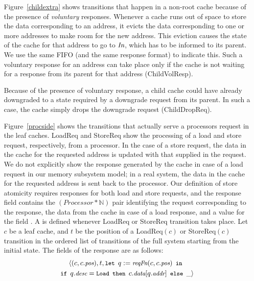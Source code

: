 Figure~\ref{childextra} shows transitions that happen in a non-root cache
because of the presence of \emph{voluntary} responses. Whenever a cache runs
out of space to store the data corresponding to an address, it evicts the data
corresponding to one or more addresses to make room for the new address. This
eviction causes the state of the cache for that address to go to $\textit{In}$, which
has to be informed to its parent. We use the same \cpResp{} FIFO (and the same
response format) to indicate this. Such a voluntary response for an address can
take place only if the cache is not waiting for a response from its parent for
that address (ChildVolResp).

Because of the presence of voluntary response, a child cache could have already
downgraded to a state required by a downgrade request from its parent. In such
a case, the cache simply drops the downgrade request (ChildDropReq).

Figure~\ref{procside} shows the transitions that actually serve a processors
request in the leaf caches. LoadReq and StoreReq show the processing of a load
and store request, respectively, from a processor. In the case of a store
request, the data in the cache for the requested address is updated with that
supplied in the request. We do not explicitly show the response generated by
the cache in case of a load request in our memory subsystem model; in a real
system, the data in the cache for the requested address is sent back to the
processor. Our definition of store atomicity requires responses for both load
and store requests, and the response field contains the
$(\textit{Processor}*\mathbb{N})$ pair identifying the request corresponding to
the response, the data from the cache in case of a load response, and a value
for the field \tme. A \Response{} is defined whenever LoadReq or StoreReq
transition takes place. Let $c$ be a leaf cache, and $t$ be the position of a
LoadReq$(c)$ or StoreReq$(c)$ transition in the ordered list of transitions of
the full system starting from the initial state. The fields of the response are
as follows:
\begin{multline*}
\small\langle (c, c.\pos), t, \mylet q := \reqFn(c, c.\pos) \myin\\
\small\myif q.\desc = \Ld \mythen c.\data[q.\addr] \myelse \_ \rangle
\end{multline*}


